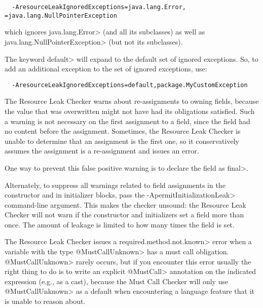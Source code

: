 \begin{verbatim}
  -AresourceLeakIgnoredExceptions=java.lang.Error, =java.lang.NullPointerException
\end{verbatim}

which ignores \<java.lang.Error> (and all its subclasses) as well as
\<java.lang.NullPointerException> (but not its subclasses).

The keyword \<default> will expand to the default set of ignored exceptions.  So,
to add an additional exception to the set of ignored exceptions, use:

\begin{verbatim}
  -AresourceLeakIgnoredExceptions=default,package.MyCustomException
\end{verbatim}



The Resource Leak Checker warns about re-assignments to owning fields,
because the value that was overwritten might not have had its obligations
satisfied.  Such a warning is not necessary on the first assignment to a
field, since the field had no content before the assignment.  Sometimes,
the Resource Leak Checker is unable to determine that an assignment is the
first one, so it conservatively assumes the assignment is a re-assignment
and issues an error.

One way to prevent this false positive warning is to declare the field as \<final>.

Alternately, to suppress all warnings related to field assignments in the
constructor and in initializer blocks, pass the
\<-ApermitInitializationLeak> command-line argument.  This makes the
checker unsound:  the Resource Leak Checker will not warn if the constructor
and initializers set a field more than once.  The amount of leakage is
limited to how many times the field is set.


The Resource Leak Checker issues a \<required.method.not.known> error
when a variable with the type \<@MustCallUnknown> has a must call obligation.
\<@MustCallUnknown> rarely occurs, but if you encounter this error usually
the right thing to do is to write an explicit \<@MustCall> annotation
on the indicated expression (e.g., as a cast), because the Must Call Checker
will only use \<@MustCallUnknown> as a default when encountering a language
feature that it is unable to reason about.

